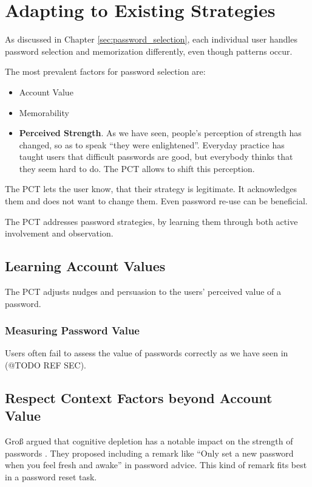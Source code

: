 \section{Adapting to Existing Strategies}
As discussed in Chapter \ref{sec:password_selection}, each individual user handles password selection and memorization differently, even though patterns occur. 

The most prevalent factors for password selection are:
\begin{itemize}
\item Account Value
\item Memorability
\item \textbf{Perceived Strength}. As we have seen, people's perception of strength has changed, so as to speak ``they were enlightened''. Everyday practice has taught users that difficult passwords are good, but everybody thinks that they seem hard to do. The PCT allows to shift this perception. 
\end{itemize}

The PCT lets the user know, that their strategy is legitimate. It acknowledges them and does not want to change them.  Even password re-use can be beneficial.

The PCT addresses password strategies, by learning them through both active involvement and observation. 


\subsection{Learning Account Values}
The PCT adjusts nudges and persuasion to the users' perceived value of a password. 

\subsubsection{Measuring Password Value}
Users often fail to assess the value of passwords correctly as we have seen in (@TODO REF SEC). 

\subsection{Respect Context Factors beyond Account Value}
Groß \etal argued that cognitive depletion has a notable impact on the strength of passwords \cite{Gross2016EffectCognitiveEffort}. They proposed including a remark like ``Only set a new password when you feel fresh and awake'' in password advice. This kind of remark fits best in a password reset task. 


